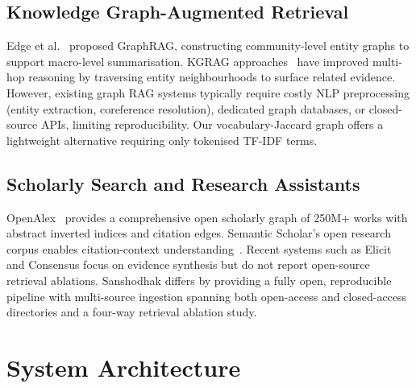 \documentclass[journal]{IEEEtran}
\begin{document}
\subsection{Knowledge Graph-Augmented Retrieval}
Edge et al.~\cite{edge2024graphrag} proposed GraphRAG, constructing
community-level entity graphs to support macro-level summarisation.
KGRAG approaches~\cite{soman2023kgrag} have improved multi-hop
reasoning by traversing entity neighbourhoods to surface related
evidence. However, existing graph RAG systems typically require
costly NLP preprocessing (entity extraction, coreference resolution),
dedicated graph databases, or closed-source APIs, limiting
reproducibility. Our vocabulary-Jaccard graph offers a lightweight
alternative requiring only tokenised TF-IDF terms.

\subsection{Scholarly Search and Research Assistants}
OpenAlex~\cite{priem2022openalex} provides a comprehensive open
scholarly graph of 250M+ works with abstract inverted indices and
citation edges. Semantic Scholar's open research corpus enables
citation-context understanding~\cite{lo2020s2orc}. Recent systems
such as Elicit and Consensus focus on evidence synthesis but do not
report open-source retrieval ablations. Sanshodhak differs by
providing a fully open, reproducible pipeline with multi-source
ingestion spanning both open-access and closed-access directories
and a four-way retrieval ablation study.

\section{System Architecture}
\label{sec:arch}
\end{document}
